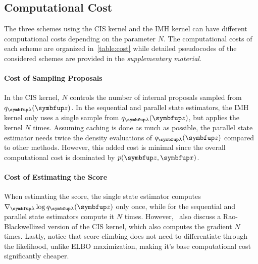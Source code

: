\vspace{-0.05in}
\subsection{Computational Cost}
\vspace{-0.05in}
The three schemes using the CIS kernel and the IMH kernel can have different computational costs depending on the parameter \(N\).
The computational costs of each scheme are organized in~\cref{table:cost} while detailed pseudocodes of the considered schemes are provided in the \textit{supplementary material}.

\vspace{-0.05in}
\paragraph{Cost of Sampling Proposals}
In the CIS kernel, \(N\) controls the number of internal proposals sampled from \(q_{\vlambda}(\vz)\).
In the sequential and parallel state estimators, the IMH kernel only uses a single sample from \(q_{\vlambda}(\vz)\), but applies the kernel \(N\) times.
Assuming caching is done as much as possible, the parallel state estimator needs twice the density evaluations of \(q_{\vlambda}(\vz)\) compared to other methods.
However, this added cost is minimal since the overall computational cost is dominated by  \(p(\vz,\vx)\).

\vspace{-0.05in}
\paragraph{Cost of Estimating the Score}
When estimating the score, the single state estimator computes \(\nabla_{\vlambda} \log q_{\vlambda}(\vz)\) only once, while for the sequential and parallel state estimators compute it \(N\) times.
However,~\cite{NEURIPS2020_b2070693} also discuss a Rao-Blackwellized version of the CIS kernel, which also computes the gradient \(N\) times.
Lastly, notice that score climbing does not need to differentiate through the likelihood, unlike ELBO maximization, making it's base computational cost significantly cheaper.

\vspace{-0.05in}
